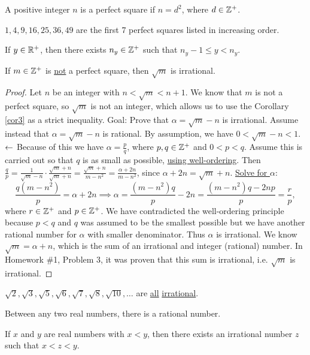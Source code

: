 \documentclass[]{article}
\begin{document}
\begin{definition}
	A positive integer $n$ is a perfect square if $n=d^2$, where $d\in\mathbb{Z}^+$.
\end{definition}
\begin{example}
	$1,4,9,16,25,36,49$ are the first 7 perfect squares listed in increasing order.
\end{example}
\begin{recall}
	 If $y\in\mathbb{R}^+$, then there exists $n_y\in\mathbb{Z}^+$ such that $n_y-1\leq y < n_y$.
\end{recall}
\begin{theorem}
	If $m\in\mathbb{Z}^+$ is \ul{not} a perfect square, then $\sqrt{m}$ is irrational.
\end{theorem}
\begin{proof}
	Let $n$ be an integer with $n<\sqrt{m} <n+1$. We know that $m$ is not a perfect square, so $\sqrt{m}$ is not an integer, which allows us to use the Corollary \ref{cor3} as a strict inequality.
	Goal: Prove that $\alpha = \sqrt{m} - n$ is irrational. Assume instead that $\alpha=\sqrt{m}-n$ is rational. By assumption, we have $0<\sqrt{m}-n <1$. $\leftarrow$ Because of this we have $\alpha = \frac{p}{q}$, where $p,q\in\mathbb{Z}^+$ and $0<p<q$. Assume this is carried out so that $q$ is as small as possible, \ul{using well-ordering}. Then $\frac{q}{p} = \frac{1}{\sqrt{m} -n} \cdot \frac{\sqrt{m}+n}{\sqrt{m}+n} = \frac{\sqrt{m}+n}{m-n^2} = \frac{\alpha+2n}{m-n^2}$, since $\alpha+2n = \sqrt{m} + n$. \ul{Solve for $\alpha$}: $$\frac{q(m-n^2)}{p} = \alpha + 2n \implies \alpha = \frac{(m-n^2)q}{p} - 2n = \frac{(m-n^2)q-2np}{p} = \frac{r}{p},$$ where $r\in\mathbb{Z}^+$ and $p\in\mathbb{Z}^+$. We have contradicted the well-ordering principle because $p<q$ and $q$ was assumed to be the smallest possible but we have another rational number for $\alpha$ with smaller denominator. Thus $\alpha$ is irrational. We know $\sqrt{m} = \alpha + n$, which is the sum of an irrational and integer (rational) number. In Homework \#1, Problem 3, it was proven that this sum is irrational, i.e. $\sqrt{m}$ is irrational.
\end{proof}
\begin{corollary}
	$\sqrt{2},\sqrt{3},\sqrt{5},\sqrt{6},\sqrt{7},\sqrt{8},\sqrt{10},\dots$ are \ul{all} \ul{irrational}.
\end{corollary}
\begin{recall}
	 Between any two real numbers, there is a rational number.
\end{recall}
\begin{theorem}
	 If $x$ and $y$ are real numbers with $x<y$, then there exists an irrational number $z$ such that $x<z<y$.
	\label{thm8}
\end{theorem}
\end{document}
